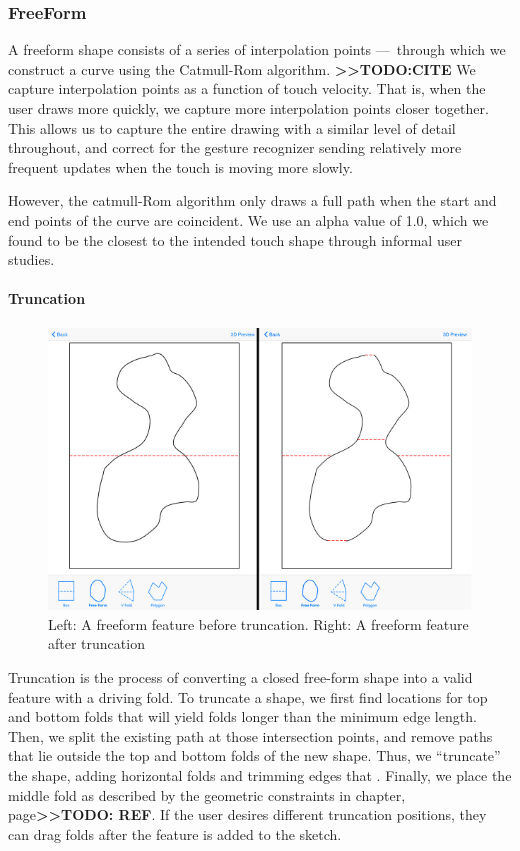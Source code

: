 \subsubsection{FreeForm}\label{freeform}

A freeform shape consists of a series of interpolation points
---~through which we construct a curve using the Catmull-Rom algorithm.
\textbf{\textgreater{}\textgreater{}TODO:CITE} We capture interpolation
points as a function of touch velocity. That is, when the user draws
more quickly, we capture more interpolation points closer together. This
allows us to capture the entire drawing with a similar level of detail
throughout, and correct for the gesture recognizer sending relatively
more frequent updates when the touch is moving more slowly.

However, the catmull-Rom algorithm only draws a full path when the start
and end points of the curve are coincident. We use an alpha value of
1.0, which we found to be the closest to the intended touch shape
through informal user studies.

\paragraph{Truncation}\label{truncation}

\begin{figure}[htbp]
\centering
\includegraphics{figures/41_Tech_Tool_Implementation/truncationBeforeAfter.pdf}
\caption{Left: A freeform feature before truncation. Right: A freeform
feature after truncation}
\end{figure}

Truncation is the process of converting a closed free-form shape into a
valid feature with a driving fold. To truncate a shape, we first find
locations for top and bottom folds that will yield folds longer than the
minimum edge length. Then, we split the existing path at those
intersection points, and remove paths that lie outside the top and
bottom folds of the new shape. Thus, we ``truncate'' the shape, adding
horizontal folds and trimming edges that . Finally, we place the middle
fold as described by the geometric constraints in chapter,
page\textbf{\textgreater{}\textgreater{}TODO: REF}. If the user desires
different truncation positions, they can drag folds after the feature is
added to the sketch.

